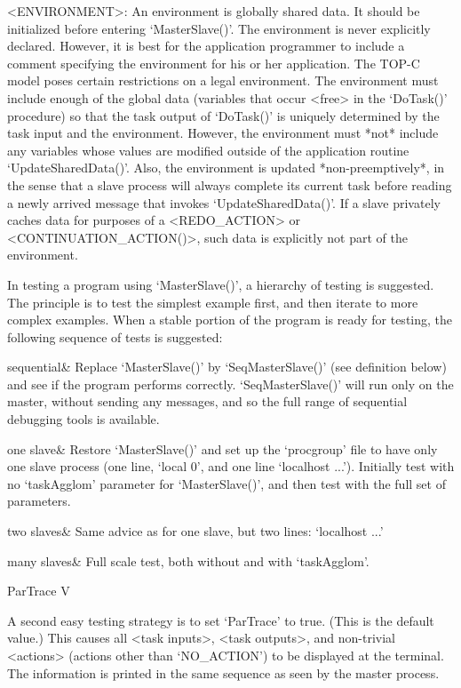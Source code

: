 
<ENVIRONMENT>: An environment is globally shared data.  It should be
initialized before entering `MasterSlave()'.  The environment is never
explicitly declared.  However, it is best for the application
programmer to include a comment specifying the environment for his or
her application.  The TOP-C model poses certain restrictions on a
legal environment.  The environment must include enough of the global
data (variables that occur <free> in the `DoTask()' procedure) so that
the task output of `DoTask()' is uniquely determined by the task input
and the environment.  However, the environment must *not* include any
variables whose values are modified outside of the application routine
`UpdateSharedData()'.  Also, the environment is updated
*non-preemptively*, in the sense that a slave process will always
complete its current task before reading a newly arrived message that
invokes `UpdateSharedData()'.  If a slave privately caches data for
purposes of a <REDO_ACTION> or <CONTINUATION_ACTION()>, such data is
explicitly not part of the environment.

\label{debug}

In testing a program using `MasterSlave()', a hierarchy of testing is
suggested.  The principle is to test the simplest example first, and
then iterate to more complex examples.  When a stable portion of the
program is ready for testing, the following sequence of tests is
suggested:

\beginitems
sequential& Replace `MasterSlave()' by `SeqMasterSlave()' (see
definition below) and see if the program performs correctly.
`SeqMasterSlave()' will run only on the master, without sending any
messages, and so the full range of sequential debugging tools is
available.

one slave& Restore `MasterSlave()' and set up the `procgroup' file to
have only one slave process (one line, `local 0', and one line
`localhost ...').  Initially test with no `taskAgglom' parameter for
`MasterSlave()', and then test with the full set of parameters.

two slaves& Same advice as for one slave, but two lines: `localhost ...'

many slaves& Full scale test, both without and with `taskAgglom'.

\enditems

\>ParTrace V

A second easy testing strategy is to set `ParTrace' to true.  (This is
the default value.)  This causes all <task inputs>, <task outputs>,
and non-trivial <actions> (actions other than `NO_ACTION') to be
displayed at the terminal.  The information is printed in the same
sequence as seen by the master process.

